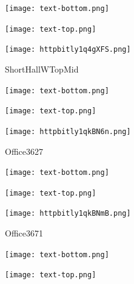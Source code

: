 \documentclass[letterpaper]{article}
\begin{document}
 \centerline{\texttt{[image: text-bottom.png]}} 
 
 \pagebreak 
{} 
 \vspace*{\fill} 
 
  \centerline{\texttt{[image: text-top.png]}} 
 
 \vspace{0.5in} 
 
 \begingroup 
 \centerline{\texttt{[image: httpbitly1q4gXFS.png]}} 
 \endgroup 
 \vspace*{\fill} 

 \hfill{\small ShortHallWTopMid} 

  \vspace{0.7in} 
 
 \centerline{\texttt{[image: text-bottom.png]}} 
 
 \pagebreak 
{} 
 \vspace*{\fill} 
 
  \centerline{\texttt{[image: text-top.png]}} 
 
 \vspace{0.5in} 
 
 \begingroup 
 \centerline{\texttt{[image: httpbitly1qkBN6n.png]}} 
 \endgroup 
 \vspace*{\fill} 

 \hfill{\small Office3627} 

  \vspace{0.7in} 
 
 \centerline{\texttt{[image: text-bottom.png]}} 
 
 \pagebreak 
{} 
 \vspace*{\fill} 
 
  \centerline{\texttt{[image: text-top.png]}} 
 
 \vspace{0.5in} 
 
 \begingroup 
 \centerline{\texttt{[image: httpbitly1qkBNmB.png]}} 
 \endgroup 
 \vspace*{\fill} 

 \hfill{\small Office3671} 

  \vspace{0.7in} 
 
 \centerline{\texttt{[image: text-bottom.png]}} 
 
 \pagebreak 
{} 
 \vspace*{\fill} 
 
  \centerline{\texttt{[image: text-top.png]}} 
 
 \vspace{0.5in} 
 
\end{document}
